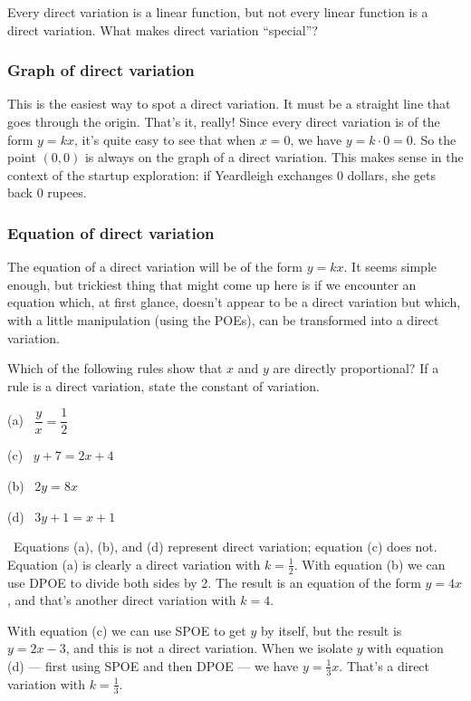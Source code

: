 Every direct variation is a linear function, but not every linear function is a direct variation. What makes direct variation ``special''?

\subsubsection{Graph of direct variation}

This is the easiest way to spot a direct variation. It must be a straight line that goes through the origin. That's it, really! Since every direct variation is of the form $y=kx$, it's quite easy to see that when $x=0$, we have $y = k\cdot0 = 0$. So the point $(0,0)$ is always on the graph of a direct variation. This makes sense in the context of the startup exploration: if Yeardleigh exchanges 0 dollars, she gets back 0 rupees.

\subsubsection{Equation of direct variation}

The equation of a direct variation will be of the form $y = kx$. It seems simple enough, but trickiest thing that might come up here is if we encounter an equation which, at first glance, doesn't appear to be a direct variation but which, with a little manipulation (using the POEs), can be transformed into a direct variation.

\begin{boxedex}
Which of the following rules show that $x$ and $y$ are directly proportional? If a rule is a direct variation, state the constant of variation.

\begin{center}
\begin{minipage}{0.4\linewidth}
(a)~ $\dfrac{y}{x} = \dfrac{1}{2}$

(c)~ $y + 7 = 2x + 4$
\end{minipage}
%
\begin{minipage}{0.4\linewidth}
(b)~ $2y = 8x$

(d)~ $3y + 1 = x + 1$
\end{minipage}
\end{center}

\exsoln\ Equations (a), (b), and (d) represent direct variation; equation (c) does not. Equation (a) is clearly a direct variation with $k = \frac{1}{2}$. With equation (b) we can use DPOE to divide both sides by 2. The result is an equation of the form $y=4x$, and that's another direct variation with $k=4$.

With equation (c) we can use SPOE to get $y$ by itself, but the result is $y = 2x-3$, and this is not a direct variation. When we isolate $y$ with equation (d) --- first using SPOE and then DPOE --- we have $y = \frac{1}{3}x$. That's a direct variation with $k=\frac{1}{3}$.
\end{boxedex}

